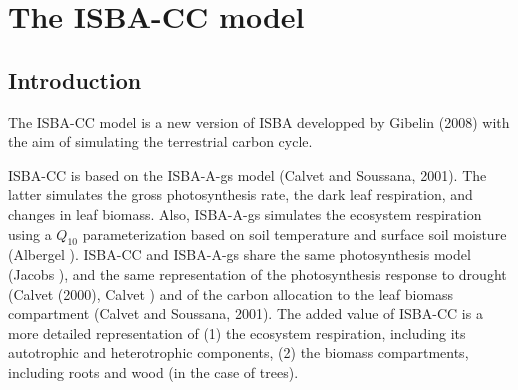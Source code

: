 {%
\section{{The ISBA-CC model}}\label{sect:isbacc_model}


\subsection{{Introduction}}

The ISBA-CC model is a new version of ISBA developped by Gibelin \etal (2008) 
with the aim of simulating the terrestrial carbon cycle.

ISBA-CC is based on the ISBA-A-gs model (Calvet and Soussana, 2001). The latter simulates 
the gross photosynthesis rate, the dark leaf respiration, and changes in leaf biomass.
Also, ISBA-A-gs simulates the ecosystem respiration using a $Q_{10}$ parameterization based 
on soil temperature and surface soil moisture (Albergel ).
ISBA-CC and ISBA-A-gs share the same photosynthesis model (Jacobs ), 
and the same representation of the photosynthesis response to drought (Calvet (2000), Calvet ) 
and of the carbon allocation to the leaf biomass compartment (Calvet
and Soussana, 2001).
The added value of ISBA-CC is a more detailed representation of (1) the ecosystem respiration, 
including its autotrophic and heterotrophic components, (2) the biomass compartments, including roots 
and wood (in the case of trees).

}
